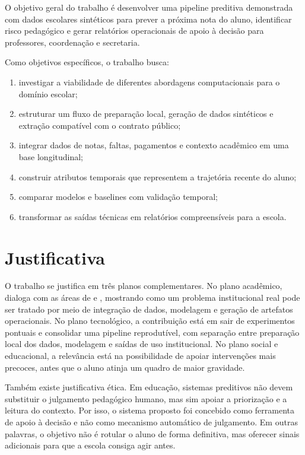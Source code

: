 O objetivo geral do trabalho \'e desenvolver uma pipeline preditiva demonstrada com dados escolares sintéticos para prever a pr\'oxima nota do aluno, identificar risco pedag\'ogico e gerar relat\'orios operacionais de apoio \`a decis\~ao para professores, coordena\c{c}\~ao e secretaria.

Como objetivos espec\'ificos, o trabalho busca:

\begin{enumerate}
    \item investigar a viabilidade de diferentes abordagens computacionais para o dom\'inio escolar;
    \item estruturar um fluxo de prepara\c{c}\~ao local, gera\c{c}\~ao de dados sintéticos e extra\c{c}\~ao compat\'ivel com o contrato p\'ublico;
    \item integrar dados de notas, faltas, pagamentos e contexto acad\^emico em uma base longitudinal;
    \item construir atributos temporais que representem a trajet\'oria recente do aluno;
    \item comparar modelos e baselines com valida\c{c}\~ao temporal;
    \item transformar as sa\'idas t\'ecnicas em relat\'orios compreens\'iveis para a escola.
\end{enumerate}

\section{Justificativa}
\label{sec:justificativa}

O trabalho se justifica em tr\^es planos complementares. No plano acad\^emico, dialoga com as \'areas de  e , mostrando como um problema institucional real pode ser tratado por meio de integra\c{c}\~ao de dados, modelagem e gera\c{c}\~ao de artefatos operacionais. No plano tecnol\'ogico, a contribui\c{c}\~ao est\'a em sair de experimentos pontuais e consolidar uma pipeline reprodut\'ivel, com separa\c{c}\~ao entre prepara\c{c}\~ao local dos dados, modelagem e sa\'idas de uso institucional. No plano social e educacional, a relev\^ancia est\'a na possibilidade de apoiar interven\c{c}\~oes mais precoces, antes que o aluno atinja um quadro de maior gravidade.

Tamb\'em existe justificativa \'etica. Em educa\c{c}\~ao, sistemas preditivos n\~ao devem substituir o julgamento pedag\'ogico humano, mas sim apoiar a prioriza\c{c}\~ao e a leitura do contexto. Por isso, o sistema proposto foi concebido como ferramenta de apoio \`a decis\~ao e n\~ao como mecanismo autom\'atico de julgamento. Em outras palavras, o objetivo n\~ao \'e rotular o aluno de forma definitiva, mas oferecer sinais adicionais para que a escola consiga agir antes.

